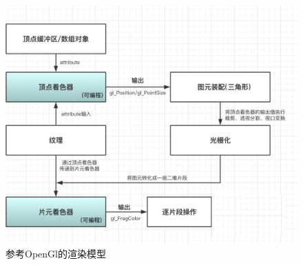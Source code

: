       \begin{spacing}{2.5}
      \begin{figure}[H]
    	\centering
		\includegraphics[width=1.0\textwidth]{images/gl_texture.jpg}
		\caption{参考OpenGl的渲染模型}
		\label{gl_texture}
    \end{figure}
    

\end{spacing}
